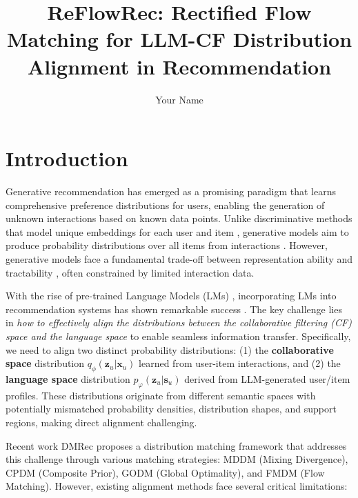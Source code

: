 \documentclass[sigconf]{acmart}
\title{ReFlowRec: Rectified Flow Matching for LLM-CF Distribution Alignment in Recommendation}
\author{Your Name}
\affiliation{%
  \institution{Your Institution}
  \city{Your City}
  \country{Your Country}}
\begin{document}
\maketitle

\section{Introduction}
Generative recommendation \cite{liang2018variational, wang2023diffusion} has emerged as a promising paradigm that learns comprehensive preference distributions for users, enabling the generation of unknown interactions based on known data points. Unlike discriminative methods that model unique embeddings for each user and item \cite{he2020lightgcn}, generative models aim to produce probability distributions over all items from interactions \cite{liang2018variational}. However, generative models face a fundamental trade-off between representation ability and tractability \cite{kingma2016improved}, often constrained by limited interaction data.

With the rise of pre-trained Language Models (LMs) \cite{touvron2023llama, zhao2023survey}, incorporating LMs into recommendation systems has shown remarkable success \cite{xi2024towards, ren2024representation, wei2024llmrec}. The key challenge lies in \textit{how to effectively align the distributions between the collaborative filtering (CF) space and the language space} to enable seamless information transfer. Specifically, we need to align two distinct probability distributions: (1) the \textbf{collaborative space} distribution $q_\phi(\mathbf z_u|\mathbf x_u)$ learned from user-item interactions, and (2) the \textbf{language space} distribution $p_\varphi(\mathbf z_u|\mathbf s_u)$ derived from LLM-generated user/item profiles. These distributions originate from different semantic spaces with potentially mismatched probability densities, distribution shapes, and support regions, making direct alignment challenging.

Recent work DMRec \cite{zhang2024dmrec} proposes a distribution matching framework that addresses this challenge through various matching strategies: MDDM (Mixing Divergence), CPDM (Composite Prior), GODM (Global Optimality), and FMDM (Flow Matching). However, existing alignment methods face several critical limitations:
\end{document}
